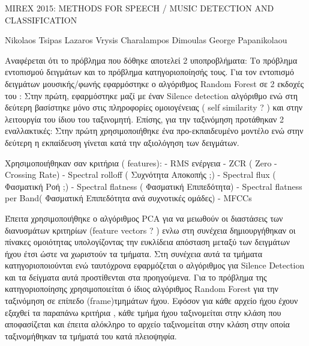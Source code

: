 MIREX 2015: METHODS FOR SPEECH / MUSIC DETECTION AND CLASSIFICATION

Nikolaos Tsipas Lazaros Vrysis Charalampos Dimoulas George Papanikolaou

Αναφέρεται ότι το πρόβλημα που δόθηκε αποτελεί 2 υποπροβλήματα: Το πρόβλημα εντοπισμού δειγμάτων και το πρόβλημα κατηγοριοποίησής τους.
Για τον εντοπισμό δειγμάτων μουσικής/φωνής εφαρμόστηκε ο αλγόριθμος Random Forest σε 2 εκδοχές του : Στην πρώτη, εφαρμόστηκε μαζί με έναν Silence detection αλγόριθμο ενώ στη δεύτερη βασίστηκε μόνο στις πληροφορίες ομοιογένειας ( self similarity ? ) και στην λειτουργία του ίδιου του ταξινομητή. Επίσης, για την ταξινόμηση προτάθηκαν 2 εναλλακτικές: Στην πρώτη χρησιμοποιήθηκε ένα προ-εκπαιδευμένο μοντέλο ενώ στην δεύτερη η εκπαίδευση γίνεται κατά την αξιολόγηση των δειγμάτων.

 Χρησιμοποιήθηκαν σαν κριτήρια ( features):
- RMS ενέργεια
- ZCR ( Zero - Crossing Rate)
- Spectral rolloff ( Συχνότητα Αποκοπής ;)
- Spectral flux ( Φασματική Ροή ;)
- Spectral flatness ( Φασματική Επιπεδότητα)
- Spectral flatness per Band( Φασματική Επιπεδότητα ανά συχνοτικές ομάδες)
- MFCCs

Έπειτα χρησιμοποιήθηκε ο αλγόριθμος PCA για να μειωθούν οι διαστάσεις των διανυσμάτων κριτηρίων (feature vectors ? ) ενλω στη συνέχεια δημιουργήθηκαν οι πίνακες ομοιότητας υπολογίζοντας την ευκλίδεια απόσταση μεταξύ των δειγμάτων ήχου έτσι ώστε να χωριστούν τα τμήματα. Στη συνέχεια αυτά τα τμήματα κατηγοριοποιούνται ενώ ταυτόχρονα εφαρμόζεται ο αλγόριθμος για Silence Detection και τα δείγματα αυτά προστίθενται στα προηγούμενα. Για το πρόβλημα της κατηγοριοποίησης χρησιμοποιείται ό ίδιος αλγόριθμος Random Forest για την ταξινόμηση σε επίπεδο (frame)τμημάτων ήχου. Εφόσον για κάθε αρχείο ήχου έχουν εξαχθεί τα παραπάνω κριτήρια , κάθε τμήμα ήχου ταξινομείται στην κλάση που αποφασίζεται και έπειτα αλόκληρο το αρχείο ταξινομείται στην κλάση στην οποία ταξινομήθηκαν τα τμήματά του κατά πλειοψηφία.